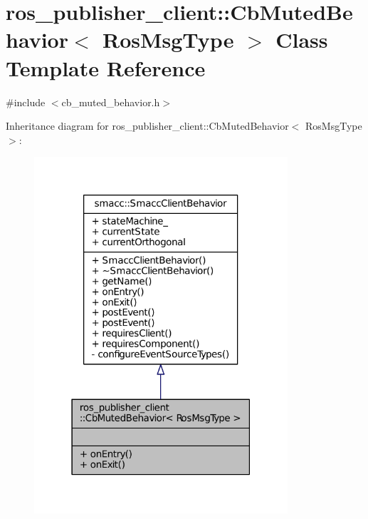 \hypertarget{classros__publisher__client_1_1CbMutedBehavior}{}\section{ros\+\_\+publisher\+\_\+client\+:\+:Cb\+Muted\+Behavior$<$ Ros\+Msg\+Type $>$ Class Template Reference}
\label{classros__publisher__client_1_1CbMutedBehavior}


{\ttfamily \#include $<$cb\+\_\+muted\+\_\+behavior.\+h$>$}



Inheritance diagram for ros\+\_\+publisher\+\_\+client\+:\+:Cb\+Muted\+Behavior$<$ Ros\+Msg\+Type $>$\+:
\nopagebreak
\begin{figure}[H]
\begin{center}
\leavevmode
\includegraphics[width=267pt]{classros__publisher__client_1_1CbMutedBehavior__inherit__graph}
\end{center}
\end{figure}


